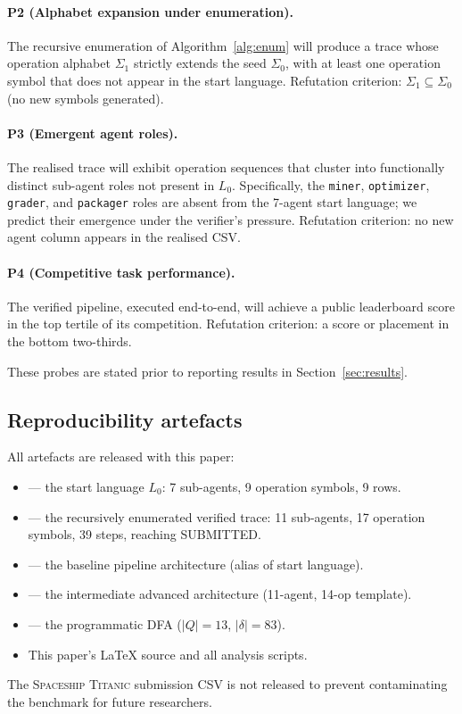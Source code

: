 \paragraph{P2 (Alphabet expansion under enumeration).}
The recursive enumeration of Algorithm~\ref{alg:enum} will produce
a trace whose operation alphabet $\Sigma_1$ strictly extends the
seed $\Sigma_0$, with at least one operation symbol that does not
appear in the start language.  Refutation criterion: $\Sigma_1
\subseteq \Sigma_0$ (no new symbols generated).

\paragraph{P3 (Emergent agent roles).}
The realised trace will exhibit operation sequences that cluster
into functionally distinct sub-agent roles not present in $L_0$.
Specifically, the \texttt{miner}, \texttt{optimizer},
\texttt{grader}, and \texttt{packager} roles are absent from the
7-agent start language; we predict their emergence under the
verifier's pressure.  Refutation criterion: no new agent column
appears in the realised CSV.

\paragraph{P4 (Competitive task performance).}
The verified pipeline, executed end-to-end, will achieve a public
leaderboard score in the top tertile of its competition.
Refutation criterion: a score or placement in the bottom two-thirds.

These probes are stated prior to reporting results in
Section~\ref{sec:results}.

\subsection{Reproducibility artefacts}

All artefacts are released with this paper:
\begin{itemize}
\item {} --- the start
  language $L_0$: 7 sub-agents, 9 operation symbols, 9 rows.
\item {} --- the recursively
  enumerated verified trace: 11 sub-agents, 17 operation symbols,
  39 steps, reaching \textsf{SUBMITTED}.
\item {} ---
  the baseline pipeline architecture (alias of start language).
\item {} ---
  the intermediate advanced architecture (11-agent, 14-op template).
\item {} --- the
  programmatic DFA ($|Q|=13$, $|\delta|=83$).
\item This paper's \LaTeX{} source and all analysis scripts.
\end{itemize}

The \textsc{Spaceship Titanic} submission CSV is not released to
prevent contaminating the benchmark for future researchers.
